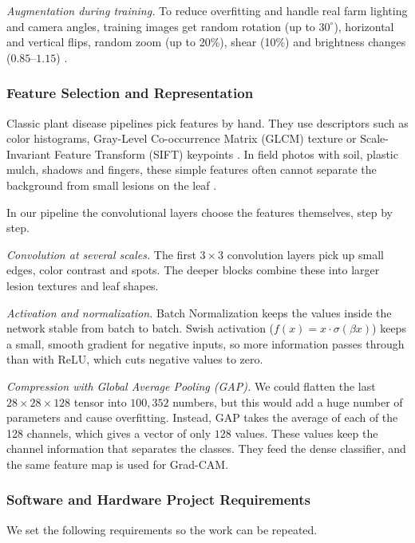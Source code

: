 \textit{Augmentation during training.} To reduce overfitting and handle real farm lighting and camera angles, training images get random rotation (up to $30^\circ$), horizontal and vertical flips, random zoom (up to 20\%), shear (10\%) and brightness changes ($0.85$--$1.15$) \cite{shorten2019survey}.

\subsubsection{Feature Selection and Representation}
Classic plant disease pipelines pick features by hand. They use descriptors such as color histograms, Gray-Level Co-occurrence Matrix (GLCM) texture or Scale-Invariant Feature Transform (SIFT) keypoints \cite{alhiary2011fast, arivazhagan2013detection, pujari2016image}. In field photos with soil, plastic mulch, shadows and fingers, these simple features often cannot separate the background from small lesions on the leaf \cite{ngugi2021recent}.

In our pipeline the convolutional layers choose the features themselves, step by step.

\textit{Convolution at several scales.} The first $3 \times 3$ convolution layers pick up small edges, color contrast and spots. The deeper blocks combine these into larger lesion textures and leaf shapes.

\textit{Activation and normalization.} Batch Normalization \cite{ioffe2015batch} keeps the values inside the network stable from batch to batch. Swish activation ($f(x) = x \cdot \sigma(\beta x)$) \cite{ramachandran2017swish} keeps a small, smooth gradient for negative inputs, so more information passes through than with ReLU, which cuts negative values to zero.

\textit{Compression with Global Average Pooling (GAP).} We could flatten the last $28 \times 28 \times 128$ tensor into $100{,}352$ numbers, but this would add a huge number of parameters and cause overfitting. Instead, GAP takes the average of each of the 128 channels, which gives a vector of only $128$ values. These values keep the channel information that separates the classes. They feed the dense classifier, and the same feature map is used for Grad-CAM.

\subsubsection{Software and Hardware Project Requirements}
We set the following requirements so the work can be repeated.


